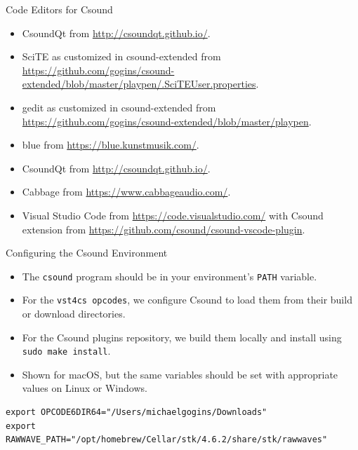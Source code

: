 \documentclass{beamer}
\begin{document}
    \begin{frame}{Code Editors for Csound}
        \begin{itemize}
            \item CsoundQt from \url{http://csoundqt.github.io/}.
            \item SciTE as customized in csound-extended from
            \url{https://github.com/gogins/csound-extended/blob/master/playpen/.SciTEUser.properties}.
            \item gedit as customized in csound-extended from
\url{https://github.com/gogins/csound-extended/blob/master/playpen}.
            \item blue from \url{https://blue.kunstmusik.com/}.
            \item CsoundQt from \url{http://csoundqt.github.io/}.
            \item Cabbage from \url{https://www.cabbageaudio.com/}.
            \item Visual Studio Code from \url{https://code.visualstudio.com/} with
            Csound extension from \url{https://github.com/csound/csound-vscode-plugin}.
        \end{itemize}
    \end{frame}
    
    \begin{frame}{Configuring the Csound Environment}
    	\begin{itemize}
		\item The \texttt{csound} program should be in your environment's \texttt{PATH} variable.
		\item For the \texttt{vst4cs opcodes}, we configure Csound to load them from their build or download directories.
		\item For the Csound plugins repository, we build them locally and install using \texttt{sudo make install}.
		\item Shown for macOS, but the same variables should be set with appropriate values on Linux or Windows.
	\end{itemize}
    \end{frame}    
    \begin{lstlisting}
export OPCODE6DIR64="/Users/michaelgogins/Downloads"
export RAWWAVE_PATH="/opt/homebrew/Cellar/stk/4.6.2/share/stk/rawwaves"
     \end{lstlisting}
    
\end{document}
